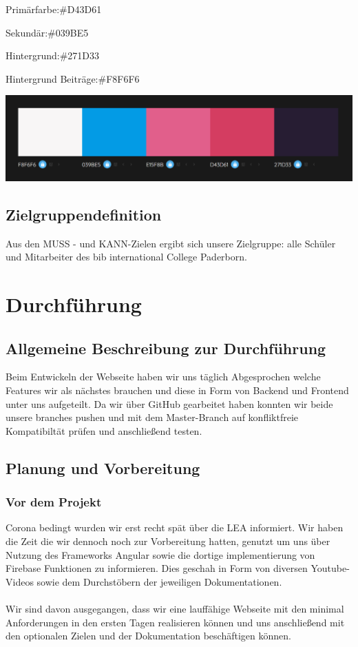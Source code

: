 \documentclass[12pt,titlepage]{article}
\begin{document}
Primärfarbe:\#D43D61

Sekundär:\#039BE5

Hintergrund:\#271D33

Hintergrund Beiträge:\#F8F6F6

\includegraphics[width=400pt]{images/Schema_1.png}

\subsection{Zielgruppendefinition}

Aus den MUSS - und KANN-Zielen ergibt sich unsere Zielgruppe: alle Schüler und Mitarbeiter des bib international College Paderborn. 


\section{Durchführung}

\subsection{Allgemeine Beschreibung zur Durchführung}

Beim Entwickeln der Webseite  haben wir uns täglich Abgesprochen welche Features wir als nächstes brauchen und diese in Form von  Backend und Frontend unter uns aufgeteilt. Da wir über GitHub gearbeitet haben konnten wir beide unsere branches pushen und mit dem Master-Branch auf konfliktfreie Kompatibiltät prüfen und anschließend testen.

\subsection{Planung und Vorbereitung}

\subsubsection{Vor dem Projekt}

Corona bedingt wurden wir erst recht spät über die LEA informiert. Wir haben die Zeit die wir dennoch noch zur Vorbereitung hatten, genutzt um uns über Nutzung des Frameworks Angular sowie die dortige implementierung von Firebase Funktionen zu informieren. Dies geschah in Form von diversen Youtube-Videos sowie dem Durchstöbern der jeweiligen Dokumentationen.\\ \\
Wir sind davon ausgegangen, dass wir eine lauffähige Webseite mit den minimal Anforderungen in den ersten Tagen realisieren können und uns anschließend mit den optionalen Zielen und der Dokumentation beschäftigen können.
\end{document}
